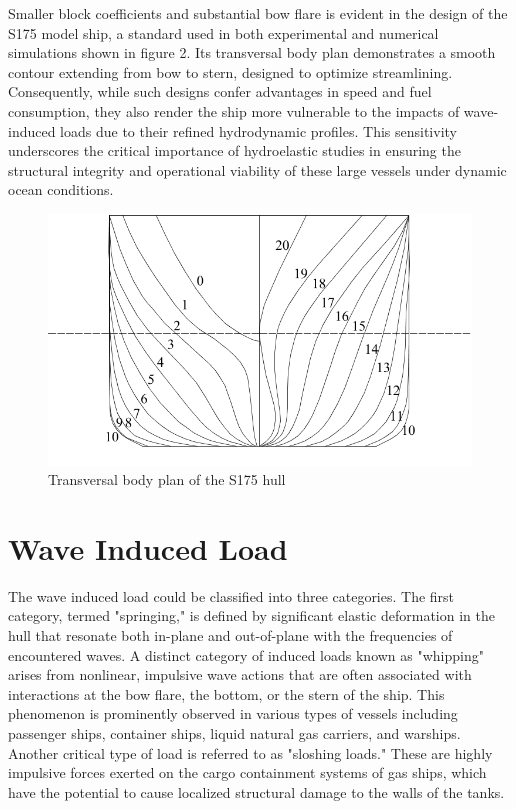 \documentclass[12pt]{article} %
\begin{document}
Smaller block coefficients and substantial bow flare is evident in the design of the S175 model ship, a standard used in both experimental and numerical simulations shown in figure 2. 
Its transversal body plan demonstrates a smooth contour extending from bow to stern, designed to optimize streamlining. 
Consequently, while such designs confer advantages in speed and fuel consumption, they also render the ship more vulnerable 
to the impacts of wave-induced loads due to their refined hydrodynamic profiles. This sensitivity underscores the critical 
importance of hydroelastic studies in ensuring the structural integrity and operational viability of these large vessels under dynamic ocean conditions.
\begin{figure}[ht]
    \centering
    \includegraphics[width=1\textwidth]{S175_transverse.png}
    \caption{Transversal body plan of the S175 hull\cite{1}}
\end{figure}

\clearpage
\section{Wave Induced Load}

The wave induced load could be classified into three categories. The first category, termed "springing," is defined by significant elastic deformation in the hull that 
resonate both in-plane and out-of-plane with the frequencies of encountered waves. A distinct category of induced loads 
known as "whipping" arises from nonlinear, impulsive wave actions that are often associated with interactions at the bow flare, 
the bottom, or the stern of the ship. This phenomenon is prominently observed in various types of vessels including passenger ships, 
container ships, liquid natural gas carriers, and warships. Another critical type of load is referred to as "sloshing loads." 
These are highly impulsive forces exerted on the cargo containment systems of gas ships, which have the potential to cause 
localized structural damage to the walls of the tanks.
\end{document}
